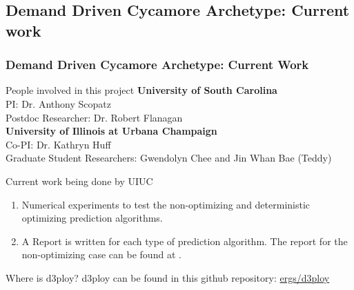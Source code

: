 \subsection{Demand Driven Cycamore Archetype:  Current work}
\begin{frame}
  \frametitle{Demand Driven Cycamore Archetype: Current Work}

\begin{block}{People involved in this project}
	\textbf{University of South Carolina}\\
	PI: Dr. Anthony Scopatz \\
	 Postdoc Researcher: Dr. Robert Flanagan \\
	\textbf{University of Illinois at Urbana Champaign} \\
	Co-PI: Dr. Kathryn Huff \\
	Graduate Student Researchers: Gwendolyn Chee and Jin Whan Bae (Teddy)
\end{block}

\begin{block}{Current work being done by UIUC}
	\begin{enumerate}
		\item Numerical experiments to test the non-optimizing and deterministic optimizing prediction algorithms. 
		\item A Report is written for each type of prediction algorithm. The report for the non-optimizing case can be found at \cite{bae_numerical_2018}. 
	\end{enumerate}
\end{block}

\begin{block}{Where is d3ploy?}
	d3ploy can be found in this github repository: \href{https://github.com/ergs/d3ploy}{ergs/d3ploy} 
\end{block}

\end{frame}
